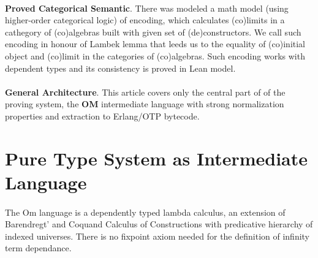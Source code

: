\documentclass[11pt,oneside]{article}
\begin{document}
\paragraph{}
{\bf Proved Categorical Semantic}. There was modeled a math model (using
higher-order categorical logic) of encoding, which calculates (co)limits in a
cathegory of (co)algebras built with given set of (de)constructors.
We call such encoding in honour of Lambek lemma that leeds us to the
equality of (co)initial object and (co)limit in the categories of (co)algebras.
Such encoding works with dependent types and its consistency is proved in Lean model.

\paragraph{}
{\bf General Architecture}. This article covers only the central part of
of the proving system, the {\bf OM} intermediate language with strong
normalization properties and extraction to Erlang/OTP bytecode.

\begin{center}
\end{center}

\newpage
\section{Pure Type System as Intermediate Language}

   \paragraph{}
   The Om language is a dependently typed lambda calculus, an extension of Barendregt'
   and Coquand Calculus of Constructions with predicative hierarchy of indexed universes.
   There is no fixpoint axiom needed for the definition of infinity term dependance.
\end{document}
